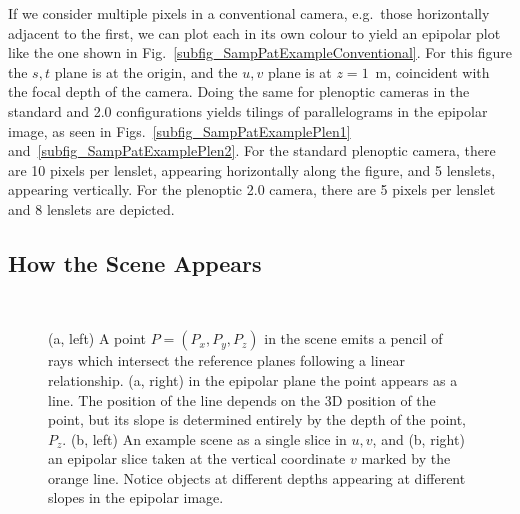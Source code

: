 \documentclass[onecolumn]{article}
\begin{document}
If we consider multiple pixels in a conventional camera, e.g.~those horizontally adjacent to the first, we can plot each in its own colour to yield an epipolar plot like the one shown in Fig.~\ref{subfig_SampPatExampleConventional}.  For this figure the $s,t$ plane is at the origin, and the $u,v$ plane is at $z = 1$~m, coincident with the focal depth of the camera.  Doing the same for plenoptic cameras in the standard and 2.0 configurations yields tilings of parallelograms in the epipolar image, as seen in Figs.~\ref{subfig_SampPatExamplePlen1} and~\ref{subfig_SampPatExamplePlen2}.  For the standard plenoptic camera, there are 10 pixels per lenslet, appearing horizontally along the figure, and 5 lenslets, appearing vertically.  For the plenoptic 2.0 camera, there are 5 pixels per lenslet and 8 lenslets are depicted.

\subsection{How the Scene Appears}

\begin{figure}
	\centering
	\\
	\caption{(a, left) A point $P = (P_x,P_y,P_z)$ in the scene emits a pencil of rays which intersect the reference planes following a linear relationship.  (a, right) in the epipolar plane the point appears as a line. The position of the line depends on the 3D position of the point, but its slope is determined entirely by the depth of the point, $P_z$. (b, left) An example scene as a single slice in $u,v$, and (b, right) an epipolar slice taken at the vertical coordinate $v$ marked by the orange line.  Notice objects at different depths appearing at different slopes in the epipolar image.}
	\label{fig_PtPlane}
\end{figure}
\end{document}
